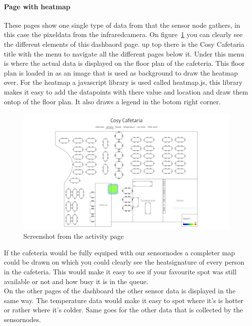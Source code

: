 \documentclass[11pt,a4paper]{article}
\begin{document}
\paragraph{Page with heatmap}
These pages show one single type of data from that the sensor node gathers, in this case the pixeldata from the infraredcamera.
On figure~\ref{fig:heatmap_example} you can clearly see the different elements of this dashbaord page. up top there is the Cosy Cafetaria title with the menu to navigate all the different pages below it.
Under this menu is where the actual data is displayed on the floor plan of the cafeteria. This floor plan is loaded in as an image that is used as background to draw the heatmap over.
For the heatmap a javascript library is used called heatmap.js, this library makes it easy to add the datapoints with there value and location and draw them ontop of the floor plan.
It also draws a legend in the botom right corner.
\begin{figure}[H]
	\centering
	\includegraphics[width=1.0\linewidth]{heatmapExample.png}
	\caption{Screenshot from the activity page}
	\label{fig:heatmap_example}
\end{figure}
If the cafeteria would be fully equiped with our sensornodes a completer map could be drawn on which you could clearly see the heatsignature of every person in the cafeteria.
This would make it easy to see if your favourite spot was still available or not and how busy it is in the queue.
\\
On the other pages of the dashboard the other sensor data is displayed in the same way. 
The temperature data would make it easy to spot where it's is hotter or rather where it's colder.
Same goes for the other data that is collected by the sensornodes.
\end{document}
